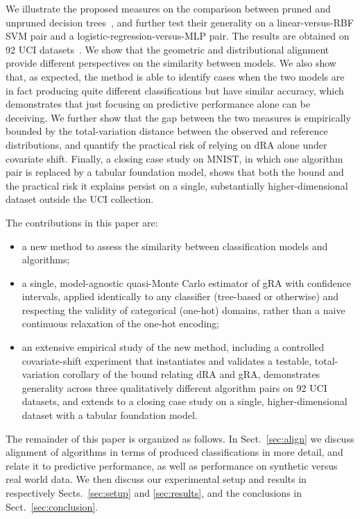 \documentclass[runningheads]{llncs}
\begin{document}
We illustrate the proposed measures on the comparison between pruned and unpruned decision trees~\cite{Aggarwal2015}, and further test their generality on a linear-versus-RBF SVM pair and a logistic-regression-versus-MLP pair. The results are obtained on 92 UCI datasets~\cite{UCI2025}.
We show that the geometric and distributional alignment provide different perspectives on the similarity between models.
We also show that, as expected, the method is able to identify cases when the two models are in fact producing quite different classifications but have similar accuracy, which demonstrates that just focusing on predictive performance alone can be deceiving. We further show that the gap between the two measures is empirically bounded by the total-variation distance between the observed and reference distributions, and quantify the practical risk of relying on dRA alone under covariate shift. Finally, a closing case study on MNIST, in which one algorithm pair is replaced by a tabular foundation model, shows that both the bound and the practical risk it explains persist on a single, substantially higher-dimensional dataset outside the UCI collection.

The contributions in this paper are:
\begin{itemize}
\item a new method to assess the similarity between classification models and algorithms;
\item a single, model-agnostic quasi-Monte Carlo estimator of gRA with confidence intervals, applied identically to any classifier (tree-based or otherwise) and respecting the validity of categorical (one-hot) domains, rather than a naive continuous relaxation of the one-hot encoding;
\item an extensive empirical study of the new method, including a controlled covariate-shift experiment that instantiates and validates a testable, total-variation corollary of the bound relating dRA and gRA, demonstrates generality across three qualitatively different algorithm pairs on 92 UCI datasets, and extends to a closing case study on a single, higher-dimensional dataset with a tabular foundation model.
\end{itemize}

The remainder of this paper is organized as follows. In Sect.~\ref{sec:align} we discuss alignment of algorithms in terms of produced classifications in more detail, and relate it to predictive performance, as well as performance on synthetic versus real world data. We then discuss our experimental setup and results in respectively Sects.~\ref{sec:setup} and \ref{sec:results}, and the conclusions in Sect.~\ref{sec:conclusion}.
\end{document}

